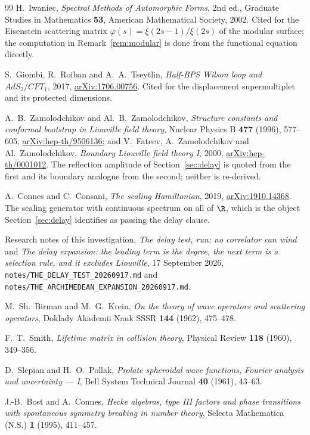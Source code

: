 \begin{thebibliography}{99}
H.~Iwaniec, \emph{Spectral Methods of Automorphic Forms}, 2nd ed., Graduate
Studies in Mathematics \textbf{53}, American Mathematical Society, 2002. Cited for
the Eisenstein scattering matrix $\varphi(s)=\xi(2s-1)/\xi(2s)$ of the modular
surface; the computation in Remark~\ref{rem:modular} is done from the functional
equation directly.

S.~Giombi, R.~Roiban and A.~A.~Tseytlin, \emph{Half-BPS Wilson loop and
$AdS_2/CFT_1$}, 2017, \href{https://arxiv.org/abs/1706.00756}{arXiv:1706.00756}.
Cited for the displacement supermultiplet and its protected dimensions.

A.~B.~Zamolodchikov and Al.~B.~Zamolodchikov, \emph{Structure constants and
conformal bootstrap in Liouville field theory}, Nuclear Physics B \textbf{477}
(1996), 577--605,
\href{https://arxiv.org/abs/hep-th/9506136}{arXiv:hep-th/9506136}; and
V.~Fateev, A.~Zamolodchikov and Al.~Zamolodchikov, \emph{Boundary Liouville field
theory I}, 2000, \href{https://arxiv.org/abs/hep-th/0001012}{arXiv:hep-th/0001012}.
The reflection amplitude of Section~\ref{sec:delay} is quoted from the first and
its boundary analogue from the second; neither is re-derived.

A.~Connes and C.~Consani, \emph{The scaling Hamiltonian}, 2019,
\href{https://arxiv.org/abs/1910.14368}{arXiv:1910.14368}. The scaling generator
with continuous spectrum on all of $\R$, which is the object
Section~\ref{sec:delay} identifies as passing the delay clause.

Research notes of this investigation, \emph{The delay test, run: no correlator can
wind} and \emph{The delay expansion: the leading term is the degree, the next term
is a selection rule, and it excludes Liouville}, 17 September 2026,
\texttt{notes/THE\_DELAY\_TEST\_20260917.md} and
\texttt{notes/THE\_ARCHIMEDEAN\_EXPANSION\_20260917.md}.

M.~Sh.~Birman and M.~G.~Krein, \emph{On the theory of wave operators and
scattering operators}, Doklady Akademii Nauk SSSR \textbf{144} (1962), 475--478.

F.~T.~Smith, \emph{Lifetime matrix in collision theory}, Physical Review
\textbf{118} (1960), 349--356.

D.~Slepian and H.~O.~Pollak, \emph{Prolate spheroidal wave functions, Fourier
analysis and uncertainty --- I}, Bell System Technical Journal \textbf{40}
(1961), 43--63.

J.-B.~Bost and A.~Connes, \emph{Hecke algebras, type III factors and phase
transitions with spontaneous symmetry breaking in number theory}, Selecta
Mathematica (N.S.) \textbf{1} (1995), 411--457.
\end{thebibliography}
